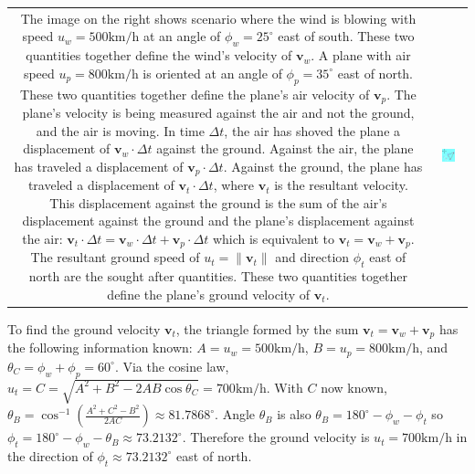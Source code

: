 \documentclass{article}
\begin{document}
\begin{tabular}{cc}
\parbox{0.5\textwidth}{
The image on the right shows scenario where the wind is blowing with speed \(u_w = 500\text{km/h}\) at an angle of \(\phi_w = 25^\circ\) east of south. These two quantities together define the wind's velocity of \(\mathbf{v}_w\). A plane with air speed \(u_p = 800\text{km/h}\) is oriented at an angle of \(\phi_p = 35^\circ\) east of north. These two quantities together define the plane's air velocity of \(\mathbf{v}_p\). The plane's velocity is being measured against the air and not the ground, and the air is moving. In time \(\Delta t\), the air has shoved the plane a displacement of \(\mathbf{v}_w \cdot \Delta t\) against the ground. Against the air, the plane has traveled a displacement of \(\mathbf{v}_p \cdot \Delta t\). Against the ground, the plane has traveled a displacement of \(\mathbf{v}_t \cdot \Delta t\), where \(\mathbf{v}_t\) is the resultant velocity. This displacement against the ground is the sum of the air's displacement against the ground and the plane's displacement against the air: \(\mathbf{v}_t \cdot \Delta t = \mathbf{v}_w \cdot \Delta t + \mathbf{v}_p \cdot \Delta t\) which is equivalent to \(\mathbf{v}_t = \mathbf{v}_w + \mathbf{v}_p\). The resultant ground speed of \(u_t = \|\mathbf{v}_t\|\) and direction \(\phi_t\) east of north are the sought after quantities. These two quantities together define the plane's ground velocity of \(\mathbf{v}_t\).    
} & \parbox{0.5\textwidth}{
\includegraphics[width = 0.5\textwidth]{wind_currents}
}
\end{tabular}

To find the ground velocity \(\mathbf{v}_t\), the triangle formed by the sum \(\mathbf{v}_t = \mathbf{v}_w + \mathbf{v}_p\) has the following information known: \(A = u_w = 500\text{km/h}\), \(B = u_p = 800\text{km/h}\), and \(\theta_C = \phi_w + \phi_p = 60^\circ\). Via the cosine law, \(u_t = C = \sqrt{A^2 + B^2 - 2AB\cos\theta_C} = 700\text{km/h}\). With \(C\) now known, \(\theta_B = \cos^{-1}\left(\frac{A^2 + C^2 - B^2}{2AC}\right) \approx 81.7868^\circ\). Angle \(\theta_B\) is also \(\theta_B = 180^\circ - \phi_w - \phi_t\) so \(\phi_t = 180^\circ - \phi_w - \theta_B \approx 73.2132^\circ\). Therefore the ground velocity is \(u_t = 700\text{km/h}\) in the direction of \(\phi_t \approx 73.2132^\circ\) east of north.
\end{document}

